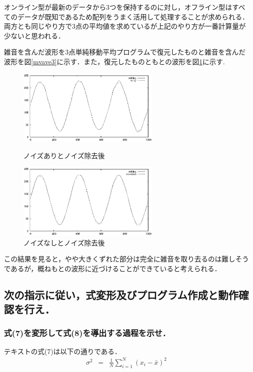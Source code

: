 \documentclass[titlepage]{jarticle}
\begin{document}
オンライン型が最新のデータから3つを保持するのに対し，オフライン型はすべてのデータが既知であるため配列をうまく活用して処理することが求められる．両方とも同じやり方で3点の平均値を求めているが上記のやり方が一番計算量が少ないと思われる．

雑音を含んだ波形を3点単純移動平均プログラムで復元したものと雑音を含んだ波形を図\ref{mvave3}に示す．また，復元したものともとの波形を図\ref{sin_mvave3}に示す.
\begin{figure}[H]
  \begin{minipage}{0.495\hsize}
    \centering
    \includegraphics[width=7cm]{EPS/point_3_noise_deleat.eps}
    \caption{ノイズありとノイズ除去後}
    \label{mvave3}
  \end{minipage}
  \begin{minipage}{0.495\hsize}
    \centering
    \includegraphics[width=7cm]{EPS/sin100f3_3point.eps}
    \caption{ノイズなしとノイズ除去後}
    \label{sin_mvave3}
  \end{minipage}
\end{figure}
この結果を見ると，やや大きくずれた部分は完全に雑音を取り去るのは難しそうであるが，概ねもとの波形に近づけることができていると考えられる．
\subsection{次の指示に従い，式変形及びプログラム作成と動作確認を行え．}
\subsubsection{式(7)を変形して式(8)を導出する過程を示せ．}
テキストの式(7)は以下の通りである．
\begin{eqnarray*}
  \sigma^{2} & = & \frac{1}{N} \sum_{i=1}^{N}(x_{i} - \bar{x})^{2}
\end{eqnarray*}
\end{document}

